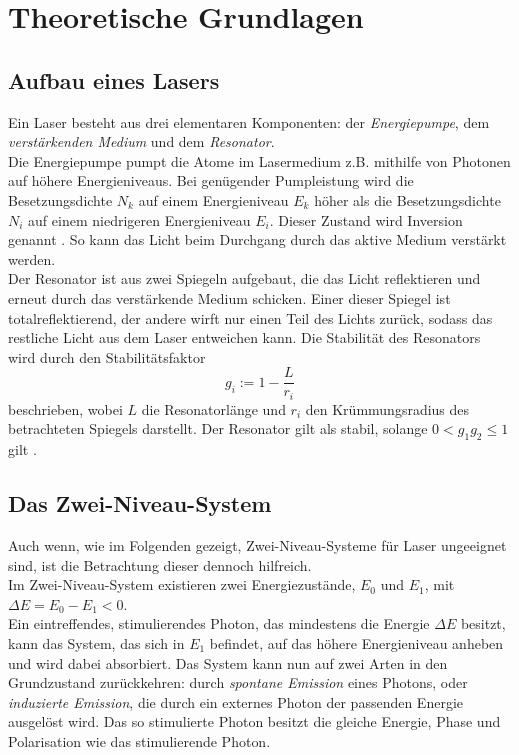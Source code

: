 \section{Theoretische Grundlagen}
\label{sec:theorie}

\subsection{Aufbau eines Lasers}

Ein Laser besteht aus drei elementaren Komponenten: der \textit{Energiepumpe}, dem \textit{verstärkenden Medium} und dem \textit{Resonator}. \\
Die Energiepumpe pumpt die Atome im Lasermedium z.B. mithilfe von Photonen auf höhere Energieniveaus. 
Bei genügender Pumpleistung wird die Besetzungsdichte $N_k$ auf einem Energieniveau $E_k$ höher als die Besetzungsdichte $N_i$ auf einem niedrigeren Energieniveau $E_i$.
Dieser Zustand wird Inversion genannt \cite{dem01}.
So kann das Licht beim Durchgang durch das aktive Medium verstärkt werden. \\

Der Resonator ist aus zwei Spiegeln aufgebaut, die das Licht reflektieren und erneut durch das verstärkende Medium schicken.
Einer dieser Spiegel ist totalreflektierend, der andere wirft nur einen Teil des Lichts zurück, sodass das restliche Licht aus dem Laser entweichen kann.
Die Stabilität des Resonators wird durch den Stabilitätsfaktor
\begin{equation}
    g_i := 1 - \frac{L}{r_i} 
\end{equation}
beschrieben, wobei $L$ die Resonatorlänge und $r_i$ den Krümmungsradius des betrachteten Spiegels darstellt.
Der Resonator gilt als stabil, solange $0 < g_1 g_2 \leq 1$ gilt \cite{dem01}.

\subsection{Das Zwei-Niveau-System}
\label{subsec:2nivsys}

Auch wenn, wie im Folgenden gezeigt, Zwei-Niveau-Systeme für Laser ungeeignet sind, ist die Betrachtung dieser dennoch hilfreich. \\
Im Zwei-Niveau-System existieren zwei Energiezustände, $E_0$ und $E_1$, mit $\Delta E = E_0 - E_1 < 0$. \\
Ein eintreffendes, stimulierendes Photon, das mindestens die Energie $\Delta E$ besitzt, kann das System, das sich in $E_1$ befindet, auf das höhere Energieniveau anheben und wird dabei absorbiert.
Das System kann nun auf zwei Arten in den Grundzustand zurückkehren: durch \textit{spontane Emission} eines Photons, oder \textit{induzierte Emission}, die durch ein externes Photon der passenden Energie ausgelöst wird.
Das so stimulierte Photon besitzt die gleiche Energie, Phase und Polarisation wie das stimulierende Photon. \\

